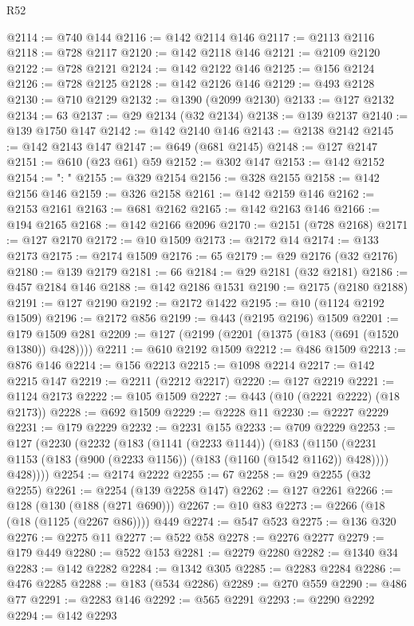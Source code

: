 \begin{lexlean}{R52}
\begin{coremodule}
{{{{{{{{{{{{{{{{{{{{{{{{{{{{{{{{{{{{{{{{{{{{{{{{{{{{{{{{{{{{{{{{{{{{{{{{{{{{{{{{{{{{{{{{{{{{{{{{{{{{{{{{{{{{{{{{{{{{{{{{{{{{{{{{{{{{{{{{{{{{{{{{{{{{{{{{{{{{{{{{{{{{{{{{{{{{{{{{{{{{{{{{{{{{{{{{{{{{{{@2114 := @740 @144
@2116 := @142 @2114 @146
@2117 := @2113 @2116
@2118 := @728 @2117
@2120 := @142 @2118 @146
@2121 := @2109 @2120
@2122 := @728 @2121
@2124 := @142 @2122 @146
@2125 := @156 @2124
@2126 := @728 @2125
@2128 := @142 @2126 @146
@2129 := @493 @2128
@2130 := @710 @2129
@2132 := @1390 (@2099 @2130)
@2133 := @127 @2132
@2134 := 63
@2137 := @29 @2134 (@32 @2134)
@2138 := @139 @2137
@2140 := @139 @1750 @147
@2142 := @142 @2140 @146
@2143 := @2138 @2142
@2145 := @142 @2143 @147
@2147 := @649 (@681 @2145)
@2148 := @127 @2147
@2151 := @610 (@23 @61) @59
@2152 := @302 @147
@2153 := @142 @2152
@2154 := ": "
@2155 := @329 @2154
@2156 := @328 @2155
@2158 := @142 @2156 @146
@2159 := @326 @2158
@2161 := @142 @2159 @146
@2162 := @2153 @2161
@2163 := @681 @2162
@2165 := @142 @2163 @146
@2166 := @194 @2165
@2168 := @142 @2166 @2096
@2170 := @2151 (@728 @2168)
@2171 := @127 @2170
@2172 := @10 @1509
@2173 := @2172 @14
@2174 := @133 @2173
@2175 := @2174 @1509
@2176 := 65
@2179 := @29 @2176 (@32 @2176)
@2180 := @139 @2179
@2181 := 66
@2184 := @29 @2181 (@32 @2181)
@2186 := @457 @2184 @146
@2188 := @142 @2186 @1531
@2190 := @2175 (@2180 @2188)
@2191 := @127 @2190
@2192 := @2172 @1422
@2195 := @10 (@1124 @2192 @1509)
@2196 := @2172 @856
@2199 := @443 (@2195 @2196) @1509
@2201 := @179 @1509 @281
@2209 := @127 (@2199 (@2201 (@1375 (@183 (@691 (@1520 @1380)) @428))))
@2211 := @610 @2192 @1509
@2212 := @486 @1509
@2213 := @876 @146
@2214 := @156 @2213
@2215 := @1098 @2214
@2217 := @142 @2215 @147
@2219 := @2211 (@2212 @2217)
@2220 := @127 @2219
@2221 := @1124 @2173
@2222 := @105 @1509
@2227 := @443 (@10 (@2221 @2222) (@18 @2173))
@2228 := @692 @1509
@2229 := @2228 @11
@2230 := @2227 @2229
@2231 := @179 @2229
@2232 := @2231 @155
@2233 := @709 @2229
@2253 := @127
    (@2230
      (@2232
        (@183
          (@1141 (@2233 @1144))
          (@183
            (@1150 (@2231 @1153 (@183 (@900 (@2233 @1156)) (@183 (@1160 (@1542 @1162)) @428))))
            @428))))
@2254 := @2174 @2222
@2255 := 67
@2258 := @29 @2255 (@32 @2255)
@2261 := @2254 (@139 @2258 @147)
@2262 := @127 @2261
@2266 := @128 (@130 (@188 (@271 @690)))
@2267 := @10 @83
@2273 := @2266 (@18 (@18 (@1125 (@2267 @86)))) @449
@2274 := @547 @523
@2275 := @136 @320
@2276 := @2275 @11
@2277 := @522 @58
@2278 := @2276 @2277
@2279 := @179 @449
@2280 := @522 @153
@2281 := @2279 @2280
@2282 := @1340 @34
@2283 := @142 @2282
@2284 := @1342 @305
@2285 := @2283 @2284
@2286 := @476 @2285
@2288 := @183 (@534 @2286)
@2289 := @270 @559
@2290 := @486 @77
@2291 := @2283 @146
@2292 := @565 @2291
@2293 := @2290 @2292
@2294 := @142 @2293
}}}}}}}}}}}}}}}}}}}}}}}}}}}}}}}}}}}}}}}}}}}}}}}}}}}}}}}}}}}}}}}}}}}}}}}}}}}}}}}}}}}}}}}}}}}}}}}}}}}}}}}}}}}}}}}}}}}}}}}}}}}}}}}}}}}}}}}}}}}}}}}}}}}}}}}}}}}}}}}}}}}}}}}}}}}}}}}}}}}}}}}}}}}}}}}}}}}}}}
\end{coremodule}
\end{lexlean}
